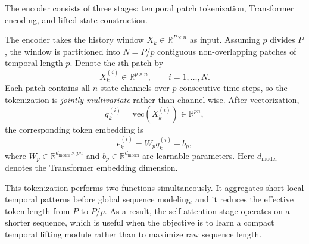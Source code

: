 \documentclass[journal]{IEEEtran}
\begin{document}
The encoder consists of three stages: temporal patch tokenization, Transformer encoding, and lifted state construction.

The encoder takes the history window $X_k \in \mathbb{R}^{P\times n}$ as input. Assuming $p$ divides $P$, the window is partitioned into $N=P/p$ contiguous non-overlapping patches of temporal length $p$. Denote the $i$th patch by
\begin{equation}
    X_k^{(i)} \in \mathbb{R}^{p\times n}, \qquad i=1,\ldots,N.
\end{equation}
Each patch contains all $n$ state channels over $p$ consecutive time steps, so the tokenization is \emph{jointly multivariate} rather than channel-wise. After vectorization,
\begin{equation}
    q_k^{(i)} = \mathrm{vec}(X_k^{(i)}) \in \mathbb{R}^{pn},
\end{equation}
the corresponding token embedding is
\begin{equation}
    e_k^{(i)} = W_p q_k^{(i)} + b_p,
    \label{eq:patch_embedding}
\end{equation}
where $W_p \in \mathbb{R}^{d_{\mathrm{model}}\times pn}$ and $b_p \in \mathbb{R}^{d_{\mathrm{model}}}$ are learnable parameters. Here $d_{\mathrm{model}}$ denotes the Transformer embedding dimension.

This tokenization performs two functions simultaneously. It aggregates short local temporal patterns before global sequence modeling, and it reduces the effective token length from $P$ to $P/p$. As a result, the self-attention stage operates on a shorter sequence, which is useful when the objective is to learn a compact temporal lifting module rather than to maximize raw sequence length.
\end{document}
